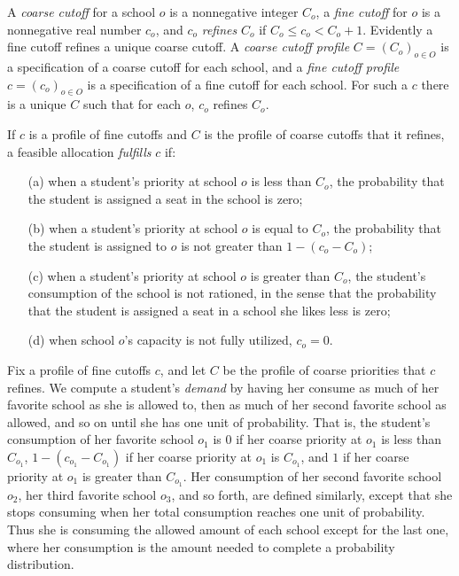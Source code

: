 \documentclass[12pt]{article}
\theoremstyle{definition}
\begin{document}
A \emph{coarse cutoff} for a school $o$ is a nonnegative integer
$C_o$, a \emph{fine cutoff} for $o$ is a nonnegative real number
$c_o$, and $c_o$ \emph{refines} $C_o$ if $C_o \le c_o < C_o + 1$.
Evidently a fine cutoff refines a unique coarse cutoff.  A
\emph{coarse cutoff profile} $C = (C_o)_{o \in O}$ is a specification
of a coarse cutoff for each school, and a \emph{fine cutoff profile}
$c = (c_o)_{o \in O}$ is a specification of a fine cutoff for each
school.  For such a $c$ there is a unique $C$ such that for each $o$,
$c_o$ refines $C_o$.

If $c$ is a profile of fine cutoffs and $C$ is the profile of coarse
cutoffs that it refines, a feasible allocation \emph{fulfills} $c$ if:
\begin{enumerate}
  \item[(a)] when a student's priority at school $o$ is less than
    $C_o$, the probability that the student is assigned a seat in the
    school is zero;
  \item[(b)] when a student's priority at school $o$ is equal to
    $C_o$, the probability that the student is assigned to $o$ is not
    greater than $1 - (c_o - C_o)$;
  \item[(c)] when a student's priority at school $o$ is greater than
    $C_o$, the student's consumption of the school is not rationed, in
    the sense that the probability that the student is assigned a seat
    in a school she likes less is zero;
  \item[(d)] when school $o$'s capacity is not fully utilized, $c_o = 0$.
\end{enumerate}

Fix a profile of fine cutoffs $c$, and let $C$ be the profile of
coarse priorities that $c$ refines.  We compute a student's
\emph{demand} by having her consume as much of her favorite school as
she is allowed to, then as much of her second favorite school as
allowed, and so on until she has one unit of probability.  That is,
the student's consumption of her favorite school $o_1$ is $0$ if her
coarse priority at $o_1$ is less than $C_{o_1}$, $1 - (c_{o_1} -
C_{o_1})$ if her coarse priority at $o_1$ is $C_{o_1}$, and $1$ if her
coarse priority at $o_1$ is greater than $C_{o_1}$.  Her consumption
of her second favorite school $o_2$, her third favorite school $o_3$,
and so forth, are defined similarly, except that she stops consuming
when her total consumption reaches one unit of probability.  Thus she
is consuming the allowed amount of each school except for the last
one, where her consumption is the amount needed to complete a
probability distribution.
\end{document}
